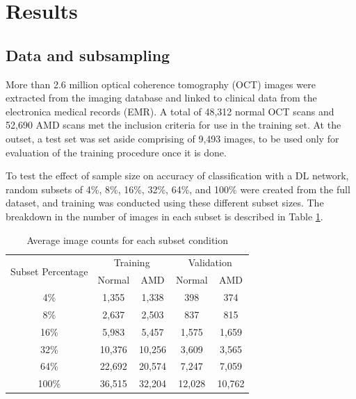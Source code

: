 \section{Results}

\subsection{Data and subsampling}

More than 2.6 million optical coherence tomography (OCT) images were extracted
from the imaging database and linked to clinical data from the electronica
medical records (EMR). A total of 48,312 normal OCT scans and 52,690 AMD scans
met the inclusion criteria for use in the training set. At the outset, a test
set was set aside comprising of 9,493 images, to be used only for evaluation of
the training procedure once it is done.

To test the effect of sample size on accuracy of classification with a DL
network, random subsets of 4\%, 8\%, 16\%, 32\%, 64\%, and 100\% were created
from the full dataset, and training was conducted using these different subset
sizes. The breakdown in the number of images in each subset is described in
Table \ref{table_counts}.

\begin{table}[!t]
\renewcommand{\arraystretch}{1.1}
\caption{Average image counts for each subset condition}
\label{table_counts}
\centering
\begin{tabular}{ccccc}
\hline
\multirow{2}{*}{Subset Percentage} & \multicolumn{2}{c}{Training} & \multicolumn{2}{c}{Validation}  \\
	 & Normal & AMD & Normal & AMD \\
\hline
4\%   & 1,355 & 1,338 & 398 & 374 \\
8\%   & 2,637 & 2,503 & 837 & 815 \\
16\%   & 5,983 & 5,457 & 1,575 & 1,659 \\
32\%   & 10,376 & 10,256 & 3,609 & 3,565 \\
64\%   & 22,692 & 20,574 & 7,247 & 7,059 \\
100\%   & 36,515 & 32,204 & 12,028 & 10,762 \\
\hline
\end{tabular}
\end{table}


